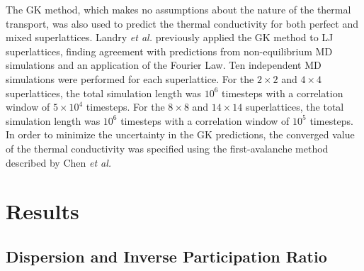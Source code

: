 \documentclass[aps,prb,preprint,preprintnumbers,amsmath,amssymb,floatfix,superscriptaddress]{revtex4}
\begin{document}
The GK method, which makes no assumptions about the nature of the thermal transport, was also used to predict the thermal conductivity for both perfect and mixed superlattices. Landry \textit{et al.} previously applied the GK method to LJ superlattices, finding agreement with predictions from non-equilibrium MD simulations and an application of the Fourier Law.\cite{PhysRevB.79.075316}
Ten independent MD simulations were performed for each superlattice. For the $2 \times 2$ and $4 \times 4$ superlattices, the total  simulation length was $10^6$ timesteps with a correlation window of $5\times 10^4$ timesteps.  For the $8 \times 8$ and $14 \times 14$ superlattices, the total  simulation length was $10^6$ timesteps with a correlation window of $10^5$ timesteps. In order to minimize the uncertainty in the GK predictions, the converged value of the thermal conductivity was specified using the first-avalanche method described by Chen \textit{et al.} \cite{Chen20102392}


\section{Results}\label{SEC:results}
\subsection{Dispersion and Inverse Participation Ratio}
\end{document}
